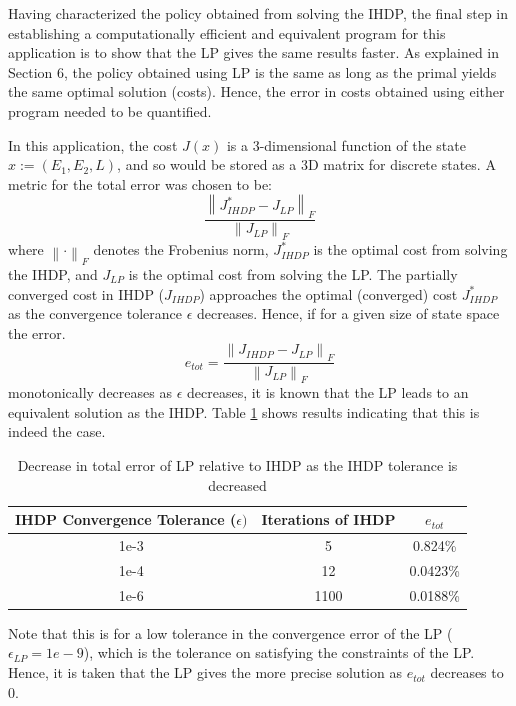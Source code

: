 \documentclass[conference]{IEEEtran}
\newcommand{\norm}[1]{\left\lVert#1\right\rVert}
\begin{document}
Having characterized the policy obtained from solving the IHDP, the final step in establishing a computationally efficient and equivalent program for this application is to show that the LP gives the same results faster. As explained in Section 6, the policy obtained using LP is the same as long as the primal yields the same optimal solution (costs). Hence, the error in costs obtained using either program needed to be quantified.

In this application, the cost $J(x)$ is a 3-dimensional function of the state $x:=(E_{1},E_{2},L)$, and so would be stored as a 3D matrix for discrete states. A metric for the total error was chosen to be:
\begin{displaymath}
    \frac{\norm{J^{*}_{IHDP}-J_{LP}}_{F}}{\norm{J_{LP}}_{F}}
\end{displaymath} where $\norm{\cdot}_{F}$ denotes the Frobenius norm, $J^{*}_{IHDP}$ is the optimal cost from solving the IHDP, and $J_{LP}$ is the optimal cost from solving the LP. The partially converged cost in IHDP ($J_{IHDP}$) approaches the optimal (converged) cost $J^{*}_{IHDP}$ as the convergence tolerance $\epsilon$ decreases. Hence, if for a given size of state space the error.
\begin{displaymath}
    e_{tot}=\frac{\norm{J_{IHDP}-J_{LP}}_{F}}{\norm{J_{LP}}_{F}}
\end{displaymath} monotonically decreases as $\epsilon$ decreases, it is known that the LP leads to an equivalent solution as the IHDP. Table \ref{tab:Table1} shows results indicating that this is indeed the case.
\begin{table}[htbp]
	\begin{center}
		\begin{tabular}{|c|c|c|}
			\hline
			\textbf{IHDP Convergence Tolerance ($\epsilon)$}&\textbf{Iterations of IHDP}&\textbf{$e_{tot}$} \\
			\hline
			1e-3& 5 & 0.824\% \\
			\hline
			1e-4& 12 & 0.0423\% \\
			\hline
			1e-6& 1100 & 0.0188\% \\
			\hline
		\end{tabular}
	\end{center}
	\caption{Decrease in total error of LP relative to IHDP as the IHDP tolerance is decreased}
	\label{tab:Table1}
\end{table} Note that this is for a low tolerance in the convergence error of the LP ($\epsilon_{LP}=1e-9$), which is the tolerance on satisfying the constraints of the LP. Hence, it is taken that the LP gives the more precise solution as $e_{tot}$ decreases to 0.
\end{document}
